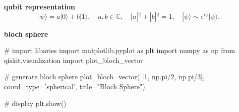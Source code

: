 \documentclass[12p,a4paper,twoside]{article}
\begin{document}
\textbf{qubit representation}
\begin{equation}\label{qubit-eq}
    |\psi\rangle = a|0\rangle + b|1\rangle, \quad a,b \in \mathbb{C}, \quad
    |a|^{2} + |b|^{2} = 1, \quad |\psi\rangle \sim e^{i\phi}|\psi\rangle.
\end{equation}

\textbf{bloch sphere}
\begin{listing}[H]
\begin{pythonblock}
    # import libaries
    import matplotlib.pyplot as plt
    import numpy as np
    from qiskit.visualization import plot_bloch_vector

    # generate bloch sphere
    plot_bloch_vector(
        [1, np.pi/2, np.pi/3],
        coord_type='spherical',
        title="Bloch Sphere")

    # display
    plt.show()
\end{pythonblock}
\caption{Simple Bloch-sphere}
\label{code:simple-bloch-sphere}
\end{listing}

  \newpage

%  
  
  \printbibliography[heading=bibintoc,title={References}] %
\end{document}
